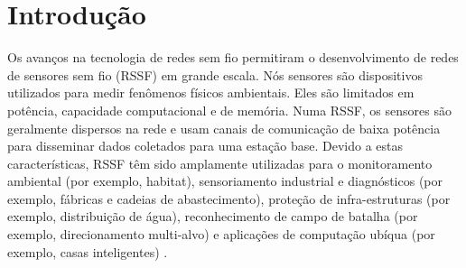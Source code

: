 \documentclass{acm_proc_article-sp}
\begin{document}
\section{Introdução}

Os avanços na tecnologia de redes sem fio permitiram o desenvolvimento de redes
de sensores sem fio (RSSF) em grande escala. Nós sensores são dispositivos
utilizados para medir fenômenos físicos ambientais. Eles são limitados em
potência, capacidade computacional e de memória. Numa RSSF, os sensores são
geralmente dispersos na rede e usam canais de comunicação de baixa potência para
disseminar dados coletados para uma estação base. Devido a estas
características, RSSF têm sido amplamente utilizadas para o monitoramento
ambiental (por exemplo, habitat), sensoriamento industrial e diagnósticos (por
exemplo, fábricas e cadeias de abastecimento), proteção de infra-estruturas (por
exemplo, distribuição de água), reconhecimento de campo de batalha (por exemplo,
direcionamento multi-alvo) e aplicações de computação ubíqua (por exemplo, casas
inteligentes) \cite{MaiaACR2013}.
\vspace*{-.3cm}
\end{document}
